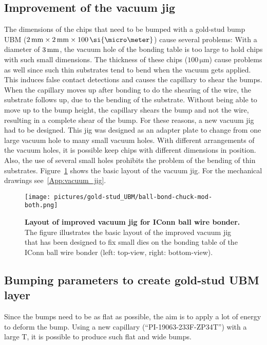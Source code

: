 \subsection{Improvement of the vacuum jig}\label{sec:bumping_vacuum_jig}
The dimensions of the chips that need to be bumped with a gold-stud bump \ac{UBM} ($2\,\rm{mm}\times 2\,\rm{mm}\times 100\,\si{\micro \meter}$) cause several problems: With a diameter of $3\,\rm{mm}$, the vacuum hole of the bonding table is too large to hold chips with such small dimensions. The thickness of these chips ($100\,\si{\micro \meter}$) cause problems as well since such thin substrates tend to bend when the vacuum gets applied. This induces false contact detections and causes the capillary to shear the bumps. When the capillary moves up after bonding to do the shearing of the wire, the substrate follows up, due to the bending of the substrate. Without being able to move up to the bump height, the capillary shears the bump and not the wire, resulting in a complete shear of the bump. For these reasons, a new vacuum jig had to be designed. This jig was designed as an adapter plate to change from one large vacuum hole to many small vacuum holes. With different arrangements of the vacuum holes, it is possible keep chips with different dimensions in position. Also, the use of several small holes prohibits the problem of the bending of thin substrates. Figure~\ref{fig:vacuum_jig} shows the basic layout of the vacuum jig. For the mechanical drawings see~\ref{App:vacuum_jig}.
\begin{figure}
\begin{center}
\texttt{[image: pictures/gold-stud\_UBM/ball-bond-chuck-mod-both.png]}
\end{center}
\caption[Layout of improved vacuum jig for IConn ball wire bonder]{\textbf{Layout of improved vacuum jig for IConn ball wire bonder.} The figure illustrates the basic layout of the improved vacuum jig that has been designed to fix small dies on the bonding table of the IConn ball wire bonder (left: top-view, right: bottom-view).}\label{fig:vacuum_jig}
\end{figure}



\subsection{Bumping parameters to create gold-stud \acs{UBM} layer}
Since the bumps need to be as flat as possible, the aim is to apply a lot of energy to deform the bump. Using a new capillary (``PI-19063-233F-ZP34T'') with a large \acl{T}, it is possible to produce such flat and wide bumps.

